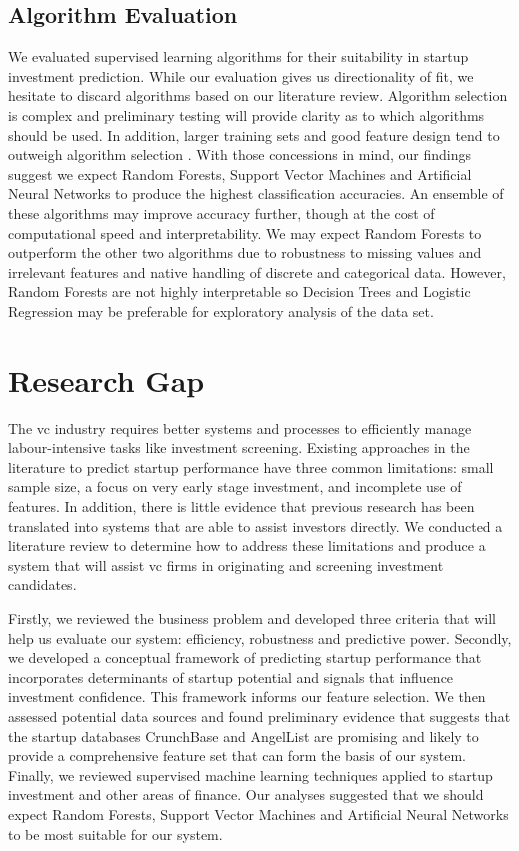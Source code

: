 \documentclass[../thesis/thesis.tex]{subfiles}
\begin{document}
\subsection{Algorithm Evaluation}

We evaluated supervised learning algorithms for their suitability in startup investment prediction. While our evaluation gives us directionality of fit, we hesitate to discard algorithms based on our literature review. Algorithm selection is complex and preliminary testing will provide clarity as to which algorithms should be used. In addition, larger training sets and good feature design tend to outweigh algorithm selection \cite{caruana2008}. With those concessions in mind, our findings suggest we expect Random Forests, Support Vector Machines and Artificial Neural Networks to produce the highest classification accuracies. An ensemble of these algorithms may improve accuracy further, though at the cost of computational speed and interpretability. We may expect Random Forests to outperform the other two algorithms due to robustness to missing values and irrelevant features and native handling of discrete and categorical data. However, Random Forests are not highly interpretable so Decision Trees and Logistic Regression may be preferable for exploratory analysis of the data set.

\section{Research Gap}

The \gls{vc} industry requires better systems and processes to efficiently manage labour-intensive tasks like investment screening. Existing approaches in the literature to predict startup performance have three common limitations: small sample size, a focus on very early stage investment, and incomplete use of features. In addition, there is little evidence that previous research has been translated into systems that are able to assist investors directly. We conducted a literature review to determine how to address these limitations and produce a system that will assist \gls{vc} firms in originating and screening investment candidates.

Firstly, we reviewed the business problem and developed three criteria that will help us evaluate our system: efficiency, robustness and predictive power. Secondly, we developed a conceptual framework of predicting startup performance that incorporates determinants of startup potential and signals that influence investment confidence. This framework informs our feature selection. We then assessed potential data sources and found preliminary evidence that suggests that the startup databases CrunchBase and AngelList are promising and likely to provide a comprehensive feature set that can form the basis of our system. Finally, we reviewed supervised machine learning techniques applied to startup investment and other areas of finance. Our analyses suggested that we should expect Random Forests, Support Vector Machines and Artificial Neural Networks to be most suitable for our system.
\end{document}
